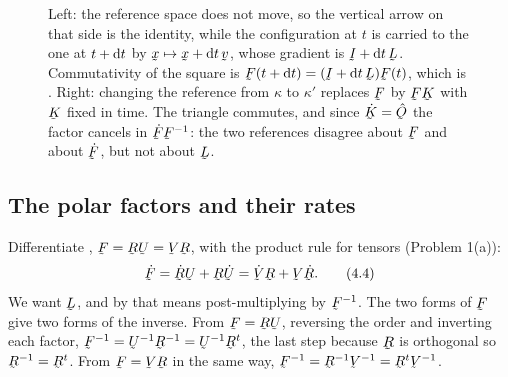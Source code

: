 \begin{figure}[htbp]\centering
\renewcommand{\thefigure}{A}
\caption{Left: the reference space does not move, so the vertical arrow on
that side is the identity, while the configuration at $t$ is carried to the
one at $t+\mathrm{d} t$ by $\bx\mapsto\bx+\dl t\,\bv$, whose gradient is
$\I+\dl t\,\bL$. Commutativity of the square is
$\bF(t+\dl t)=(\I+\dl t\,\bL)\bF(t)$, which is . Right: changing
the reference from $\kappa$ to $\kappa'$ replaces $\bF$ by $\bF\bK$ with
$\bK$ fixed in time. The triangle commutes, and since $\dot\bK=\hOb$ the
factor cancels in $\dot\bF\bF^{-1}$: the two references disagree about
$\bF$ and about $\dot\bF$, but not about $\bL$.}
\label{fig:ch4comm}
\end{figure}

\subsection*{The polar factors and their rates}

Differentiate , $\bF=\bR\bU=\bV\bR$, with the product rule for
tensors (Problem 1(a)):
\begin{equation}
   \dot\bF=\dot\bR\bU+\bR\dot\bU=\dot\bV\bR+\bV\dot\bR .
   \tag{4.4}\label{eq:4.4}
\end{equation}
We want $\bL$, and by  that means post-multiplying by
$\bF^{-1}$. The two forms of $\bF$ give two forms of the inverse. From
$\bF=\bR\bU$, reversing the order and inverting each factor,
$\bF^{-1}=\bU^{-1}\bR^{-1}=\bU^{-1}\bR^{t}$, the last step because $\bR$
is orthogonal so $\bR^{-1}=\bR^{t}$. From $\bF=\bV\bR$ in the same way,
$\bF^{-1}=\bR^{-1}\bV^{-1}=\bR^{t}\bV^{-1}$.

